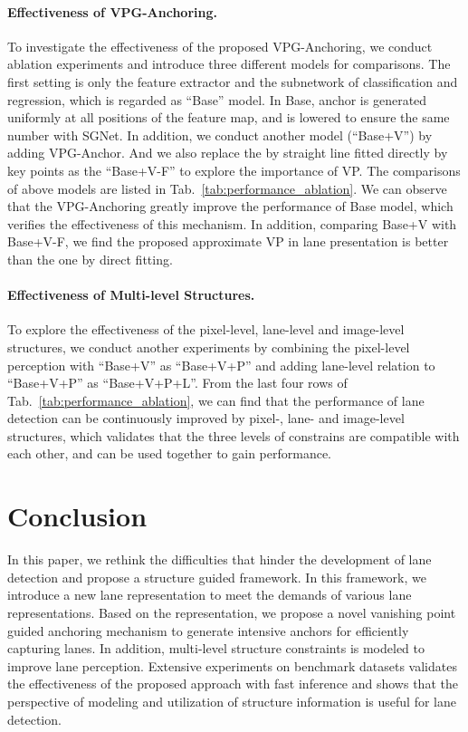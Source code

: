 \documentclass{article}
\begin{document}
\paragraph{Effectiveness of VPG-Anchoring.}
To investigate the effectiveness of the proposed VPG-Anchoring, we conduct ablation experiments and introduce three different models for comparisons. The first setting is only the feature
extractor and the subnetwork of classification and regression, which is regarded as ``Base'' model. In Base, anchor is generated uniformly at all positions of the feature map, and  is lowered to ensure the same number with SGNet. In addition, we conduct another model (``Base+V'') by adding VPG-Anchor. And we also replace the  by straight line fitted directly by key points as the ``Base+V-F'' to explore the importance of VP. The comparisons of above models are listed in Tab.~\ref{tab:performance_ablation}. We can observe that the VPG-Anchoring greatly improve the performance
 of Base model, which verifies the effectiveness of this mechanism. In addition, comparing Base+V with Base+V-F, we find the proposed approximate VP in lane presentation is better than the one by direct fitting.

\paragraph{Effectiveness of Multi-level Structures.}
To explore the effectiveness of the pixel-level, lane-level and image-level structures, we conduct another experiments by combining the pixel-level perception with ``Base+V'' as ``Base+V+P'' and 
adding lane-level relation to ``Base+V+P'' as 
``Base+V+P+L''. From the last four rows of Tab.~\ref{tab:performance_ablation}, we can find that the performance of lane detection can be continuously improved by pixel-, lane- and image-level structures, which validates that the three levels of constrains are compatible with each other, and can be used together to gain performance. 

\section{Conclusion}

In this paper, we rethink the difficulties 
that hinder the development of lane detection 
and propose a structure guided framework. In this framework, we introduce a new lane representation to meet the demands of various lane representations. Based on the representation, we propose a novel vanishing point guided anchoring mechanism to generate intensive anchors for efficiently capturing lanes.  
In addition, multi-level structure constraints is modeled to improve lane perception. Extensive experiments on benchmark datasets validates the effectiveness of the proposed approach with fast inference 
and shows that the perspective of modeling and utilization of structure information is useful for lane detection.



\end{document}
